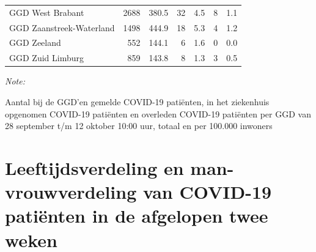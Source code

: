 \documentclass[
  english,
  man,floatsintext]{apa6}
\begin{document}
\begin{table}[H]
\begin{threeparttable}
\begin{tabular}{lrrrrrr}
GGD West Brabant & 2688 & 380.5 & 32 & 4.5 & 8 & 1.1\\
GGD Zaanstreek-Waterland & 1498 & 444.9 & 18 & 5.3 & 4 & 1.2\\
GGD Zeeland & 552 & 144.1 & 6 & 1.6 & 0 & 0.0\\
GGD Zuid Limburg & 859 & 143.8 & 8 & 1.3 & 3 & 0.5\\
\bottomrule
\end{tabular}
\begin{tablenotes}
\item \textit{Note: } 
\item Aantal bij de GGD’en gemelde COVID-19 patiënten, in het ziekenhuis opgenomen COVID-19 patiënten en overleden COVID-19 patiënten per GGD van 28 september t/m 12 oktober 10:00 uur, totaal en per 100.000 inwoners
\end{tablenotes}
\end{threeparttable}
\endgroup{}
\end{table}

\newpage

\hypertarget{leeftijdsverdeling-en-man-vrouwverdeling-van-covid-19-patiuxebnten-in-de-afgelopen-twee-weken}{%
\section{Leeftijdsverdeling en man-vrouwverdeling van COVID-19 patiënten in de afgelopen twee weken}\label{leeftijdsverdeling-en-man-vrouwverdeling-van-covid-19-patiuxebnten-in-de-afgelopen-twee-weken}}
\end{document}
